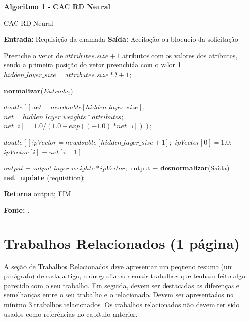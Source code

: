 \begin{center}	
    \textbf{Algoritmo 1 -  CAC RD Neural}
	\vspace{-0.3cm}
\begin{minipage}[ht]{13cm}
\begin{algorithm}[H]
  \footnotesize
  \caption{CAC-RD Neural}
  \label{alg:rnagenerica}
  \begin{algorithmic}[1]
      \STATE \textbf{Entrada:} Requisição da chamada
    \STATE \textbf{Saída:} Aceitação ou bloqueio da solicitação
    
    \STATE Preenche o vetor de $attributes.size+1$ atributos com os valores dos atributos, sendo a primeira posição do vetor preenchida com o valor 1
		\STATE $hidden\_layer\_size =  attributes.size*2+1;$

    	\STATE \textbf{normalizar}($Entrada_i$)
    \ENDFOR

		\STATE $double [] net = new double [hidden\_layer\_size];$
    \STATE $net = hidden\_layer\_weights * attributes;$
			\STATE $net [i] = 1.0 / (1.0 + exp((-1.0)*net[i]));$
		\ENDFOR

		\STATE $double [] ipVector = new double [hidden\_layer\_size+1];$
    \STATE $ipVector [0] = 1.0;$
			\STATE $ipVector [i] = net [i-1];$
		\ENDFOR
		
		\STATE $output = output\_layer\_weights *  ipVector;$
    \STATE output = \textbf{desnormalizar}(Saída)
    \STATE \textbf{net\_update} (requisition);
    
    \STATE \textbf{Retorna} output; FIM
  \end{algorithmic}
\end{algorithm}

\small \centering \textbf{\footnotesize Fonte: .}
\end{minipage}
\end{center}
   
\section{\esp Trabalhos Relacionados (1 página)}

A seção de Trabalhos Relacionados deve apresentar um pequeno resumo (um parágrafo) de cada artigo, monografia ou demais trabalhos que tenham feito algo parecido com o seu trabalho. Em seguida, devem ser destacadas as diferenças e semelhanças entre o seu trabalho e o relacionado. Devem ser apresentados no mínimo 3 trabalhos relacionados. Os trabalhos relacionados não devem ter sido usados como referências no capítulo anterior.


